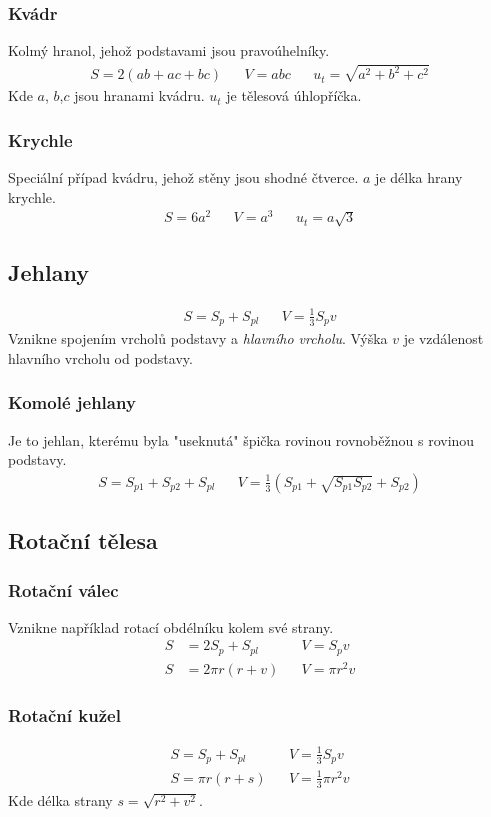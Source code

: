 \documentclass[12pt]{article}
\begin{document}
\subsubsection{Kvádr}
Kolmý hranol, jehož podstavami jsou pravoúhelníky.
\begin{align}
S = 2(ab +ac +bc) && V = abc && u_t =\sqrt{a^2 + b^2 + c^2}
\end{align}
Kde $a$, $b$,$c$ jsou hranami kvádru. $u_t$ je tělesová úhlopříčka.
\subsubsection{Krychle}
Speciální případ kvádru, jehož stěny jsou shodné čtverce. $a$ je  délka hrany krychle.
\begin{align}
S = 6a^2 && V = a^3 && u_t = a\sqrt{3}
\end{align}

\subsection{Jehlany}
\begin{align}
S = S_p + S_{pl} && V = \frac{1}{3}S_p v
\end{align}
Vznikne spojením vrcholů podstavy a \emph{hlavního vrcholu}. Výška $v$ je vzdálenost hlavního vrcholu od podstavy.
\subsubsection{Komolé jehlany}
Je to jehlan, kterému byla "useknutá" špička rovinou rovnoběžnou s rovinou podstavy.
\begin{align}
S = S_{p1} + S_{p2} + S_{pl} && V = \frac{1}{3}\left( S_{p1} + \sqrt{ S_{p1} S_{p2}} +  S_{p2} \right)
\end{align}
\subsection{Rotační tělesa}
\subsubsection{Rotační válec}
Vznikne například rotací obdélníku kolem své strany.
\begin{align}
S &= 2S_p + S_{pl} && V = S_p v\\
S &= 2\pi r(r+v) && V = \pi r^2 v
\end{align}
\subsubsection{Rotační kužel}
\begin{align}
S = S_p + S_{pl} && V = \frac{1}{3}S_p v\\
S = \pi r \left( r+s \right) && V = \frac{1}{3}\pi r^2 v
\end{align}
Kde délka strany $s = \sqrt{r^2 + v^2}$.
\end{document}
